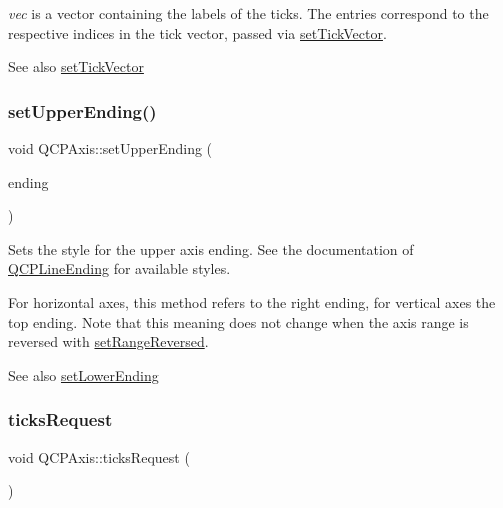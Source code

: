 {\itshape vec} is a vector containing the labels of the ticks. The entries correspond to the respective indices in the tick vector, passed via \mbox{\hyperlink{class_q_c_p_axis_a871db94c5d796c80fcbe1a9d4506e27e}{set\+Tick\+Vector}}.

\begin{DoxySeeAlso}{See also}
\mbox{\hyperlink{class_q_c_p_axis_a871db94c5d796c80fcbe1a9d4506e27e}{set\+Tick\+Vector}} 
\end{DoxySeeAlso}
\mbox{\label{class_q_c_p_axis_a69119b892fc306f651763596685aa377}} 
\subsubsection{\texorpdfstring{set\+Upper\+Ending()}{setUpperEnding()}}
{\footnotesize\ttfamily void Q\+C\+P\+Axis\+::set\+Upper\+Ending (\begin{DoxyParamCaption}\item[{const \mbox{\hyperlink{class_q_c_p_line_ending}{Q\+C\+P\+Line\+Ending}} \&}]{ending }\end{DoxyParamCaption})}

Sets the style for the upper axis ending. See the documentation of \mbox{\hyperlink{class_q_c_p_line_ending}{Q\+C\+P\+Line\+Ending}} for available styles.

For horizontal axes, this method refers to the right ending, for vertical axes the top ending. Note that this meaning does not change when the axis range is reversed with \mbox{\hyperlink{class_q_c_p_axis_a2172fdb196b1a0dc3f40992fcad8e9e1}{set\+Range\+Reversed}}.

\begin{DoxySeeAlso}{See also}
\mbox{\hyperlink{class_q_c_p_axis_a08af1c72db9ae4dc8cb8a973d44405ab}{set\+Lower\+Ending}} 
\end{DoxySeeAlso}
\mbox{\label{class_q_c_p_axis_af46d99613d29518795134ec4928e3873}} 
\subsubsection{\texorpdfstring{ticks\+Request}{ticksRequest}}
{\footnotesize\ttfamily void Q\+C\+P\+Axis\+::ticks\+Request (\begin{DoxyParamCaption}{ }\end{DoxyParamCaption})\hspace{0.3cm}{\ttfamily [signal]}}


